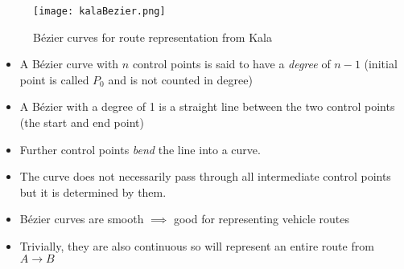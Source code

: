 \documentclass{beamer} \usepackage{pgfpages} \setbeamertemplate{bibliography item}{\insertbiblabel}
\begin{document}
\begin{frame}


    \begin{figure}[KalaBezier]
        \centering
        \texttt{[image: kalaBezier.png]}
        \caption{Bézier curves for route representation from Kala \cite{kalaOnroadIntelligentVehicles2016}}%
        \label{fig:.ext}
    \end{figure}

    \begin{itemize}
        \item A Bézier curve with $n$ control points is said to have a \textit{degree} of $n-1$ (initial point is called $P_0$ and is not counted in degree)
        \item A Bézier with a degree of 1 is a straight line between the two control points (the start and end point)
        \item Further control points \textit{bend} the line into a curve.
        \item The curve does not necessarily pass through all intermediate control points but it is determined by them.
        \item Bézier curves are smooth $\implies$ good for representing vehicle routes
        \item Trivially, they are also continuous so will represent an entire route from $A \rightarrow B$ 
    \end{itemize}
\end{frame}
\end{document}

